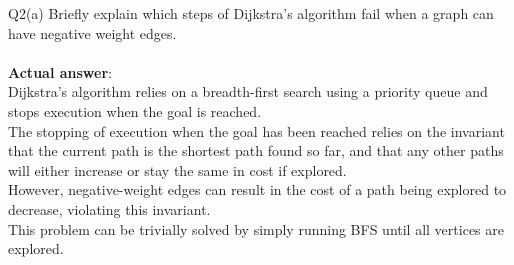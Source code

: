 \begin{problem}
  {Q2(a)}
  Briefly explain which steps of Dijkstra's algorithm fail when a graph can have negative weight edges. \\\\
  \textbf{Actual answer}: \\
  Dijkstra's algorithm relies on a breadth-first search using a priority queue and stops execution when the goal is reached. \\
  The stopping of execution when the goal has been reached relies on the invariant that the current path is the shortest path found
  so far, and that any other paths will either increase or stay the same in cost if explored. \\
  However, negative-weight edges can result in the cost of a path being explored to decrease, violating this invariant. \\
  This problem can be trivially solved by simply running BFS until all vertices are explored. \\
\end{problem}
